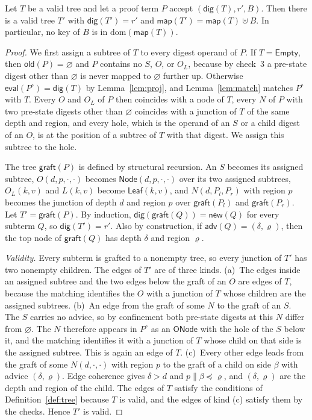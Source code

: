 \documentclass[runningheads]{llncs}
\newcommand{\dig}{\mathsf{dig}}
\newcommand{\Leaf}{\mathsf{Leaf}}
\newcommand{\Node}{\mathsf{Node}}
\newcommand{\Empty}{\mathsf{Empty}}
\newcommand{\map}{\mathsf{map}}
\newcommand{\eval}{\mathsf{eval}}
\newcommand{\ONode}{\mathsf{ONode}}
\newcommand{\Old}{\mathsf{old}}
\newcommand{\New}{\mathsf{new}}
\newcommand{\Adv}{\mathsf{adv}}
\newcommand{\Graft}{\mathsf{graft}}
\newcommand{\dom}{\mathrm{dom}}
\newcommand{\cat}{\mathbin{\|}}
\begin{document}
\begin{lemma}[Reconstruction]\label{lem:graft}
Let $T$ be a valid tree and let a proof term $P$ accept $(\dig(T), r', B)$. Then there is a valid tree $T'$ with $\dig(T') = r'$ and $\map(T') = \map(T) \uplus B$. In particular, no key of $B$ is in $\dom(\map(T))$.
\end{lemma}
\begin{proof}
We first assign a subtree of $T$ to every digest operand of $P$. If $T = \Empty$, then $\Old(P) = \varnothing$ and $P$ contains no $S$, $O$, or $O_L$, because by check~3 a pre-state digest other than $\varnothing$ is never mapped to $\varnothing$ further up. Otherwise $\eval(P^{\circ}) = \dig(T)$ by Lemma~\ref{lem:proj}, and Lemma~\ref{lem:match} matches $P^{\circ}$ with $T$. Every $O$ and $O_L$ of $P$ then coincides with a node of $T$, every $N$ of $P$ with two pre-state digests other than $\varnothing$ coincides with a junction of $T$ of the same depth and region, and every hole, which is the operand of an $S$ or a child digest of an $O$, is at the position of a subtree of $T$ with that digest. We assign this subtree to the hole.

The tree $\Graft(P)$ is defined by structural recursion. An $S$ becomes its assigned subtree, $O(d,p,\cdot,\cdot)$ becomes $\Node(d,p,\cdot,\cdot)$ over its two assigned subtrees, $O_L(k,v)$ and $L(k,v)$ become $\Leaf(k,v)$, and $N(d,P_l,P_r)$ with region $p$ becomes the junction of depth $d$ and region $p$ over $\Graft(P_l)$ and $\Graft(P_r)$. Let $T' = \Graft(P)$. By induction, $\dig(\Graft(Q)) = \New(Q)$ for every subterm $Q$, so $\dig(T') = r'$. Also by construction, if $\Adv(Q) = (\delta,\varrho)$, then the top node of $\Graft(Q)$ has depth $\delta$ and region $\varrho$.

\emph{Validity.} Every subterm is grafted to a nonempty tree, so every junction of $T'$ has two nonempty children. The edges of $T'$ are of three kinds.
(a)~The edges inside an assigned subtree and the two edges below the graft of an $O$ are edges of $T$, because the matching identifies the $O$ with a junction of $T$ whose children are the assigned subtrees.
(b)~An edge from the graft of some $N$ to the graft of an $S$. The $S$ carries no advice, so by confinement both pre-state digests at this $N$ differ from $\varnothing$. The $N$ therefore appears in $P^{\circ}$ as an $\ONode$ with the hole of the $S$ below it, and the matching identifies it with a junction of $T$ whose child on that side is the assigned subtree. This is again an edge of $T$.
(c)~Every other edge leads from the graft of some $N(d,\cdot,\cdot)$ with region $p$ to the graft of a child on side $\beta$ with advice $(\delta,\varrho)$. Edge coherence gives $\delta > d$ and $p \cat \beta \preceq \varrho$, and $(\delta,\varrho)$ are the depth and region of the child.
The edges of $T$ satisfy the conditions of Definition~\ref{def:tree} because $T$ is valid, and the edges of kind (c) satisfy them by the checks. Hence $T'$ is valid.


\end{proof}
\end{document}
